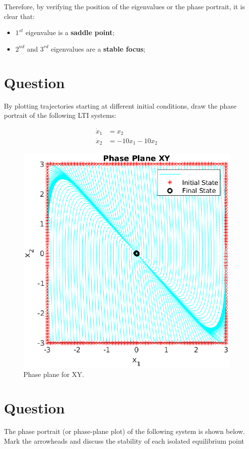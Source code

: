\documentclass[a4paper,10pt]{article}
\begin{document}
Therefore, by verifying the position of the eigenvalues or the phase portrait, it is clear that:

\begin{itemize}
 \item $1^{st}$ eigenvalue is a \textbf{saddle point};
 \item $2^{nd}$ and $3^{rd}$ eigenvalues are a \textbf{stable focus};
 \end{itemize}


\section{Question}
By plotting trajectories starting at different initial conditions, draw the phase portrait of the following LTI systems:

\begin{eqnarray}
\dot{x}_1 &= {x}_2 \\
\dot{x}_2 &= -10{x}_1-10{x}_2  
\end{eqnarray}

\begin{figure}[H]
  \centering
  \includegraphics[width=.6\linewidth]{question4.eps}
  \caption{Phase plane for XY.} \label{fig:q4}
\end{figure}

\section{Question}
The phase portrait (or phase-plane plot) of the following system is shown below.
Mark the arrowheads and discuss the stability of each isolated equilibrium point
\end{document}
